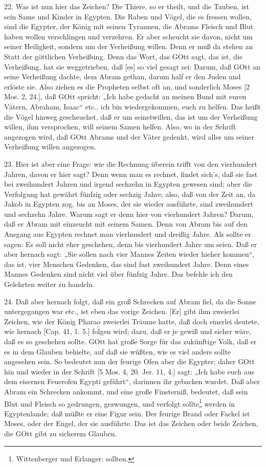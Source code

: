 22. Was ist nun hier das Zeichen? Die Thiere, so er theilt, und die Tauben, ist sein Same und Kinder in Egypten. Die Raben und Vögel, die es fressen wollen, sind die Egypter, der König mit seinen Tyrannen, die Abrams Fleisch und Blut haben wollen verschlingen und verzehren. Er aber scheucht sie davon, nicht um seiner Heiligkeit, sondern um der Verheißung willen. Denn er muß da stehen an Statt der göttlichen Verheißung. Denn das Wort, das GOtt sagt, das ist, die Verheißung, hat sie weggetrieben, daß [es] so viel gesagt sei: Darum, daß GOtt an seine Verheißung dachte, dem Abram gethan, darum half er den Juden und erlöste sie. Also ziehen es die Propheten selbst oft an, und sonderlich Moses [2 Mos. 2, 24.], daß GOtt spricht: „Ich habe gedacht an meinen Bund mit euren Vätern, Abraham, Isaac“ etc., ich bin wiedergekommen, euch zu helfen. Das heißt die Vögel hinweg gescheuchet, daß er um seinetwillen, das ist um der Verheißung willen, ihm versprochen, will seinem Samen helfen. Also, wo in der Schrift angezogen wird, daß GOtt Abrams und der Väter gedenkt, wird alles um seiner Verheißung willen angezogen.

23. Hier ist aber eine Frage: wie die Rechnung überein trifft von den vierhundert Jahren, davon er hier sagt? Denn wenn man es rechnet, findet sich’s, daß sie fast bei zweihundert Jahren und irgend sechzehn in Egypten gewesen sind; aber die Verfolgung hat gewährt fünfzig oder sechzig Jahre; also, daß von der Zeit an, da Jakob in Egypten zog, bis an Moses, der sie wieder ausführte, sind zweihundert und sechzehn Jahre. Warum sagt er denn hier von vierhundert Jahren? Darum, daß er Abram mit einzeucht mit seinem Samen. Denn von Abram bis auf den Ausgang aus Egypten rechnet man vierhundert und dreißig Jahre. Als sollte er sagen: Es soll nicht eher geschehen, denn bis vierhundert Jahre um seien. Daß er aber hernach sagt: „Sie sollen nach vier Mannes Zeiten wieder hieher kommen“, das ist, vier Menschen Gedenken, das sind fast zweihundert Jahre. Denn eines Mannes Gedenken sind nicht viel über fünfzig Jahre. Das befehle ich den Gelehrten weiter zu handeln.

24. Daß aber hernach folgt, daß ein groß Schrecken auf Abram fiel, da die Sonne untergegangen war etc., ist eben das vorige Zeichen. [Er] gibt ihm zweierlei Zeichen, wie der König Pharao zweierlei Träume hatte, daß doch einerlei deutete, wie hernach [Cap. 41, 1. 5.] folgen wird; dazu, daß er je gewiß und sicher wäre, daß es so geschehen sollte. GOtt hat große Sorge für das zukünftige Volk, daß er es in dem Glauben behielte, auf daß sie wüßten, wie es viel anders sollte angesehen sein. So bedeutet nun der feurige Ofen aber die Egypter; daher GOtt hin und wieder in der Schrift [5 Mos. 4, 20. Jer. 11, 4.] sagt: „Ich habe euch aus dem eisernen Feuerofen Egypti geführt“, darinnen ihr gebacken wurdet. Daß aber Abram ein Schrecken ankommt, und eine große Finsterniß, bedeutet, daß sein Blut und Fleisch so gedrungen, gezwungen, und verfolgt sollte\footnote{Wittenberger und Erlanger: sollten.} werden in Egyptenlande; daß müßte er eine Figur sein. Der feurige Brand oder Fackel ist Moses, oder der Engel, der sie ausführte. Das ist das Zeichen oder beide Zeichen, die GOtt gibt zu sicherem Glauben.

